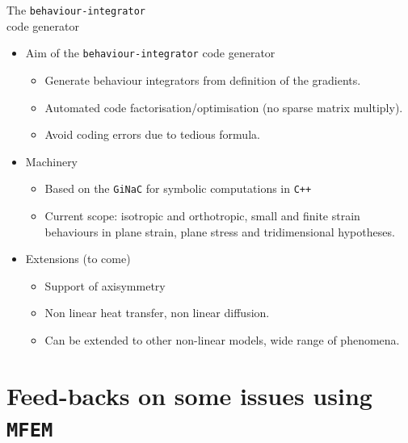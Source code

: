 \documentclass{beamer}
\begin{document}
\begin{frame}[fragile]{The
    \texttt{behaviour-integrator}\\\hspace*{1cm}code
    generator}
  \begin{itemize}
    \item Aim of the \texttt{behaviour-integrator} code
    generator
    \begin{itemize}
      \item Generate behaviour integrators from definition of the gradients.
      \item Automated code factorisation/optimisation (no sparse matrix multiply).
      \item Avoid coding errors due to tedious formula.
    \end{itemize}
    \medskip
    \item Machinery
    \begin{itemize}
      \item Based on the \texttt{GiNaC} for symbolic
      computations in \texttt{C++}
      \item Current scope: isotropic and orthotropic, small
      and finite strain behaviours in plane strain, plane stress and
      tridimensional hypotheses.
    \end{itemize}
     \medskip
     \item Extensions (to come)
    \begin{itemize}
      \item Support of axisymmetry
      \item Non linear heat transfer, non linear diffusion.
      \item Can be extended to other non-linear models, wide
      range of phenomena.
    \end{itemize}
  \end{itemize}
\end{frame}

\section{Feed-backs on some issues using {\tt MFEM}}
\end{document}

